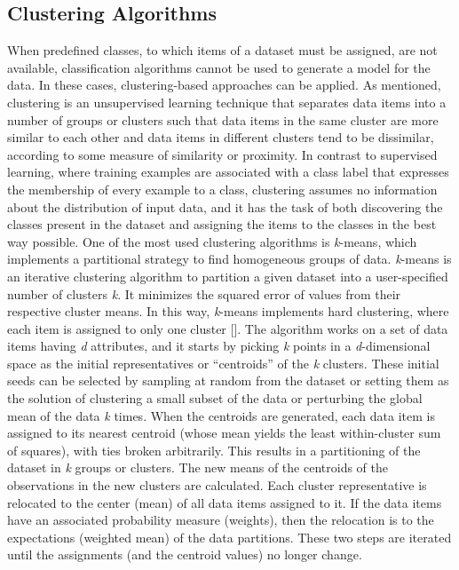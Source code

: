 \subsection{\label{sec:4.4.3}Clustering Algorithms}

\noindent When predefined classes, to which items of a dataset must be assigned, are not available, classification algorithms cannot be used to generate a model for the data. In these cases, clustering-based approaches can be applied. As mentioned, clustering is an unsupervised learning technique that separates data items into a number of groups or clusters such that data items in the same cluster are more similar to each other and data items in different clusters tend to be dissimilar, according to some measure of similarity or proximity. In contrast to supervised learning, where training examples are associated with a class label that expresses the membership of every example to a class, clustering assumes no information about the distribution of input data, and it has the task of both discovering the classes present in the dataset and assigning the items to the classes in the best way possible. One of the most used clustering algorithms is \textit{k}-means, which implements a partitional strategy to find homogeneous groups of data. \textit{k}-means is an iterative clustering algorithm to partition a given dataset into a user-specified number of clusters \textit{k}. It minimizes the squared error of values from their respective cluster means. In this way, \textit{k}-means implements hard clustering, where each item is assigned to only one cluster [\citealt{chap:4:KaufmanandRousseeuw:1990}]. The algorithm works on a set of data items having \textit{d} attributes, and it starts by picking \textit{k} points in a \textit{d}-dimensional space as the initial representatives or ``centroids'' of the \textit{k} clusters. These initial seeds can be selected by sampling at random from the dataset or setting them as the solution of clustering a small subset of the data or perturbing the global mean of the data \textit{k} times. When the centroids are generated, each data item is assigned to its nearest centroid (whose mean yields the least within-cluster sum of squares), with ties broken arbitrarily. This results in a partitioning of the dataset in \textit{k} groups or clusters. The new means of the centroids of the observations in the new clusters are calculated. Each cluster representative is relocated to the center (mean) of all data items assigned to it. If the data items have an associated probability measure (weights), then the relocation is to the expectations (weighted mean) of the data partitions. These two steps are iterated until the assignments (and the centroid values) no longer change.

